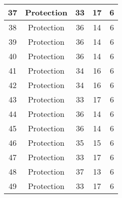 \documentclass[results.tex]{subfiles}
\begin{document}
\begin{center}
\begin{tabular}{| c || c | c | c | c |}
            \hline
            37                      & Protection                   & 33                     & 17                      & 6                    \\
            \hline
            38                      & Protection                   & 36                     & 14                      & 6                    \\
            \hline
            39                      & Protection                   & 36                     & 14                      & 6                    \\
            \hline
            40                      & Protection                   & 36                     & 14                      & 6                    \\
            \hline
            41                      & Protection                   & 34                     & 16                      & 6                    \\
            \hline
            42                      & Protection                   & 34                     & 16                      & 6                    \\
            \hline
            43                      & Protection                   & 33                     & 17                      & 6                    \\
            \hline
            44                      & Protection                   & 36                     & 14                      & 6                    \\
            \hline
            45                      & Protection                   & 36                     & 14                      & 6                    \\
            \hline
            46                      & Protection                   & 35                     & 15                      & 6                    \\
            \hline
            47                      & Protection                   & 33                     & 17                      & 6                    \\
            \hline
            48                      & Protection                   & 37                     & 13                      & 6                    \\
            \hline
            49                      & Protection                   & 33                     & 17                      & 6                    \\
            \hline
        \end{tabular}
    \end{center}
\end{document}
